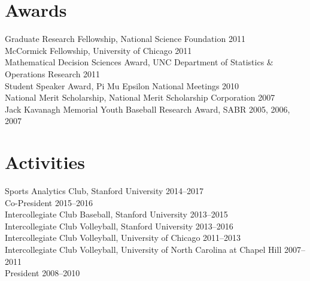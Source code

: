 \documentclass{article}
\begin{document}
\section*{\sc Awards}

Graduate Research Fellowship, National Science Foundation \hfill 2011\\
McCormick Fellowship, University of Chicago \hfill 2011\\
Mathematical Decision Sciences Award, UNC Department of Statistics \& Operations Research \hfill 2011\\
Student Speaker Award, Pi Mu Epsilon National Meetings \hfill 2010\\
National Merit Scholarship, National Merit Scholarship Corporation \hfill 2007\\
Jack Kavanagh Memorial Youth Baseball Research Award, SABR \hfill 2005, 2006, 2007

\section*{\sc Activities}

Sports Analytics Club, Stanford University \hfill 2014--2017\\
{\color{gray} \indent Co-President \hfill 2015--2016}\\
Intercollegiate Club Baseball, Stanford University \hfill 2013--2015\\
Intercollegiate Club Volleyball, Stanford University \hfill 2013--2016\\
Intercollegiate Club Volleyball, University of Chicago \hfill 2011--2013\\
Intercollegiate Club Volleyball, University of North Carolina at Chapel Hill \hfill 2007--2011\\
{\color{gray} \indent President \hfill 2008--2010}
\end{document}
